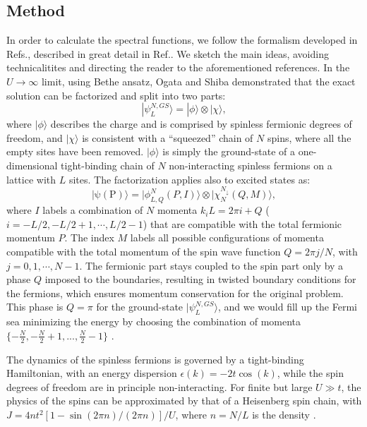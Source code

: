 \documentclass[article,11pt]{revtex4}
\begin{document}
\subsection{Method}
In order to calculate the spectral functions, we follow the formalism developed in Refs., described in great detail in Ref.. We sketch the main ideas, avoiding technicalitites and directing the reader to the aforementioned references. In the $U\rightarrow\infty$ limit, using Bethe ansatz, Ogata and Shiba demonstrated that the exact solution can be factorized and split into two parts:
\begin{equation}
|\psi^{N,GS}_L\rangle= | \phi\rangle\otimes | \chi\rangle,
\label{gs}
\end{equation}
where $|\phi\rangle$ describes the charge and is comprised by spinless fermionic degrees of freedom, and $|\chi\rangle$ is consistent with a ``squeezed'' chain of $N$ spins, where all the empty sites have been removed. $|\phi\rangle$ is simply the ground-state of a one-dimensional tight-binding chain of $N$ non-interacting spinless fermions on a lattice with $L$ sites. The factorization applies also to excited states as:
\begin{equation}
\label{ex_state}
|\mathrm{\psi(P)}\rangle= | \phi^N_{L,Q}(P,I)\rangle \otimes | \chi^{N_\downarrow}_N(Q,M)\rangle,
\end{equation} 
where $I$ labels a combination of $N$ momenta $k_i L = 2 \pi i + Q$ ($i=-L/2,-L/2+1,\cdots,L/2-1$) that are compatible with the total fermionic momentum $P$. The index $M$ labels all possible configurations of momenta compatible with the total momentum of the spin wave function $Q=2\pi j/N$, with $j=0,1,\cdots,N-1$.
The fermionic part stays coupled to the spin part only by a phase $Q$ imposed to the boundaries, resulting in twisted boundary conditions for the fermions, which ensures momentum conservation for the original problem. This phase is $Q=\pi$ for the ground-state $|\psi^{N,GS}_L\rangle$, and we would fill up the Fermi sea minimizing the energy by choosing the combination of momenta $\{-\frac{N}{2},-\frac{N}{2}+1,...,\frac{N}{2}-1\}$ \cite{Penc1997b}.

The dynamics of the spinless fermions is governed by a tight-binding Hamiltonian, with an energy dispersion $\epsilon(k)=-2t\cos(k)$, while the spin degrees of freedom are in principle non-interacting. For finite but large $U\gg t$, the physics of the spins can be approximated by that of a Heisenberg spin chain, with $J =4nt^2[1-\sin{(2\pi n)}/(2\pi n)]/U$, where $n=N/L$ is the density \cite{Penc1997,Xiang}.
\end{document}
